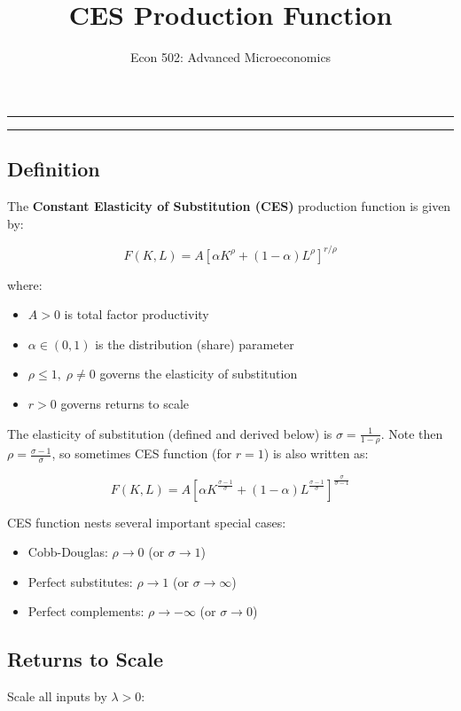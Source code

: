 \documentclass[
  11pt,
]{article}
\title{CES Production Function}
\subtitle{Econ 502: Advanced Microeconomics}
\author{}
\date{}
\makeatletter
\providecommand{\tightlist}{%
  \setlength{\itemsep}{0pt}\setlength{\parskip}{0pt}}
\renewcommand{\maketitle}{%
  \thispagestyle{plain}
  \begin{center}
    {\color{csufblue}\rule{\textwidth}{1.5pt}}\par
    \vspace{10pt}
    {\LARGE\bfseries\color{csufnavy}\@title\par}
    \vspace{8pt}
    {\color{csufblue}\rule{\textwidth}{1.5pt}}
  \end{center}
  \vspace{12pt}
}
\makeatother
\begin{document}
\maketitle


\subsection{Definition}\label{definition}

The \textbf{Constant Elasticity of Substitution (CES)} production
function is given by:

\[F(K, L) = A\left[\alpha K^{\rho} + (1-\alpha) L^{\rho}\right]^{r/\rho}\]

where:

\begin{itemize}
\tightlist
\item
  \(A > 0\) is total factor productivity
\item
  \(\alpha \in (0,1)\) is the distribution (share) parameter
\item
  \(\rho \leq 1, \; \rho \neq 0\) governs the elasticity of substitution
\item
  \(r > 0\) governs returns to scale
\end{itemize}

The elasticity of substitution (defined and derived below) is
\(\sigma = \frac{1}{1-\rho}\). Note then
\(\rho = \frac{\sigma-1}{\sigma}\), so sometimes CES function (for
\(r=1\)) is also written as:

\[F(K, L) = A\left[\alpha K^{\frac{\sigma-1}{\sigma}} + (1-\alpha) L^{\frac{\sigma-1}{\sigma}}\right]^{\frac{\sigma}{\sigma-1}}\]

CES function nests several important special cases:

\begin{itemize}
\tightlist
\item
  Cobb-Douglas: \(\rho \to 0\) (or \(\sigma \to 1\))
\item
  Perfect substitutes: \(\rho \to 1\) (or \(\sigma \to \infty\))
\item
  Perfect complements: \(\rho \to -\infty\) (or \(\sigma \to 0\))
\end{itemize}

\subsection{Returns to Scale}\label{returns-to-scale}

Scale all inputs by \(\lambda > 0\):
\end{document}
